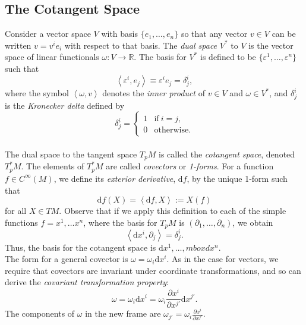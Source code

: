\subsection{The Cotangent Space}

Consider a vector space $V$ with basis $\{e_1,\dots,e_n\}$ so that any vector
$v\in V$ can be written $v=v^i e_i$ with respect to that basis. The \textit{dual
space} $V^*$ to $V$ is the vector space of linear functionals
$\omega:V\rightarrow\mathbb{R}$. The basis for $V^*$ is defined to be
$\{\varepsilon^1,\dots,\varepsilon^n\}$ such that
\[\left< \varepsilon^i, e_j \right> \equiv \varepsilon^i e_j = \delta^i_j ,\]
where the symbol $\left< \omega, v \right>$ denotes the \textit{inner product}
of $v\in V$ and $\omega\in V^*$, and $\delta^i_j$ is the \textit{Kronecker
delta} defined by
\[ \delta^i_j = \left\{ \begin{array}{ll}
										
	1 & \mbox{if}\  i=j,\\
										
	0 & \mbox{otherwise.} \end{array}\right. \]\\


The dual space to the tangent space $T_p M$ is called the \textit{cotangent
space}, denoted $T^*_p M$. The elements of $T^*_p M$ are called
\textit{covectors} or \textit{1-forms}. For a function $f\in C^{\infty}(M)$, we
define its \textit{exterior derivative}, $\mbox{d}f$, by the unique 1-form such that 
\begin{equation}
\mbox{d}f(X) = \left<\mbox{d}f,X\right> := X(f)
\label{eq:extderiv} 
\end{equation}
for all $X\in TM$. Observe that if we apply this definition to each of the
simple functions \mbox{$f=x^1,\dots x^n$}, where the basis for $T_p M$ is
$(\partial_1,\dots, \partial_n)$, we obtain
\[ \left<\mbox{d}x^i,\partial_j \right>=\delta^i_j. \]
Thus, the basis for the cotangent space is $\mbox{d} x^1,\dots, mbox{d} x^n$.\\

The form for a general covector is $\omega=\omega_i \mbox{d} x^i$. As in the
case for vectors, we require that covectors are invariant under coordinate
transformations, and so can derive the \textit{covariant transformation
property}:
\begin{equation}
\omega = \omega_{i}\mbox{d}x^{i}=\omega_i \frac{\partial x^i}{\partial x^{j'}} \mbox{d}x^{j'}. 
\label{eq:covtp}
\end{equation}
The components of $\omega$ in the new frame are $\omega_{j'}=\omega_i
\frac{\partial x^i}{\partial x^{j'}}.$

